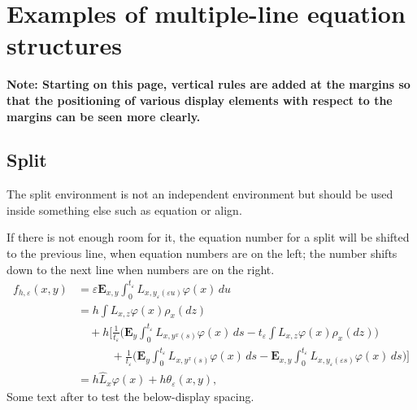 \documentclass{article}
\newcommand{\ntt}{\normalfont\ttfamily}
\newcommand{\env}[1]{{\protect\ntt#1}}
\theoremstyle{definition}
\theoremstyle{remark}
\newcommand{\wh}{\widehat}
\begin{document}
\def\@makecol{\ifvoid\footins \setbox\@outputbox\box\@cclv
   \else\setbox\@outputbox
     \vbox{\boxmaxdepth \maxdepth
     \unvbox\@cclv\vskip\skip\footins\footnoterule\unvbox\footins}\fi
  \xdef\@freelist{\@freelist\@midlist}\gdef\@midlist{}\@combinefloats
  \setbox\@outputbox\hbox{\vrule width\marginrulewidth
        \vbox to\@colht{\boxmaxdepth\maxdepth
         \@texttop\dimen128=\dp\@outputbox\unvbox\@outputbox
         \vskip-\dimen128\@textbottom}%
        \vrule width\marginrulewidth}%
     \global\maxdepth\@maxdepth}
\newdimen\marginrulewidth
\setlength{\marginrulewidth}{.1pt}
\makeatother


\appendix
\section{Examples of multiple-line equation structures}
\label{s:eq}

\textbf{\large Note: Starting on this page, vertical rules are
added at the margins so that the positioning of various display elements
with respect to the margins can be seen more clearly.}

\subsection{Split}
The \env{split} environment is not an independent environment
but should be used inside something else such as \env{equation}
or \env{align}.

If there is not enough room for it, the equation number for  a
\env{split} will be shifted to the previous line, when equation numbers are
on the left; the number shifts down to the next line when numbers are on
the right.
\begin{equation}
\begin{split}
f_{h,\varepsilon}(x,y)
&=\varepsilon\mathbf{E}_{x,y}\int_0^{t_\varepsilon}
L_{x,y_\varepsilon(\varepsilon u)}\varphi(x)\,du\\
&= h\int L_{x,z}\varphi(x)\rho_x(dz)\\
&\quad+h\biggl[\frac{1}{t_\varepsilon}\biggl(\mathbf{E}_{y}
  \int_0^{t_\varepsilon}L_{x,y^x(s)}\varphi(x)\,ds
  -t_\varepsilon\int L_{x,z}\varphi(x)\rho_x(dz)\biggr)\\
&\phantom{{=}+h\biggl[}+\frac{1}{t_\varepsilon}
  \biggl(\mathbf{E}_{y}\int_0^{t_\varepsilon}L_{x,y^x(s)}
    \varphi(x)\,ds -\mathbf{E}_{x,y}\int_0^{t_\varepsilon}
   L_{x,y_\varepsilon(\varepsilon s)}
   \varphi(x)\,ds\biggr)\biggr]\\
&=h\wh{L}_x\varphi(x)+h\theta_\varepsilon(x,y),
\end{split}
\end{equation}
Some text after to test the below-display spacing.
\end{document}
